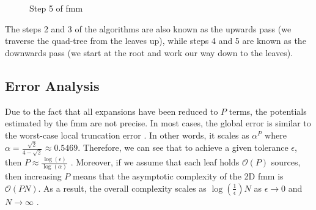 \begin{enumerate}
  \begin{figure}
    \centering
    \caption{Step 5 of \gls{fmm}}
    \label{fig:step5}
  \end{figure}
\end{enumerate}

The steps 2 and 3 of the algorithms are also known as the upwards pass (we traverse the quad-tree from the leaves up), while steps 4 and 5 are known as the downwards pass (we start at the root and work our way down to the leaves).

\subsection{Error Analysis}

Due to the fact that all expansions have been reduced to $P$ terms, the potentials estimated by the \gls{fmm} are not precise.
In most cases, the global error is similar to the worst-case local truncation error \cite{articleErick}.
In other words, it scales as  $\alpha^P$ where  $\alpha = \frac{\sqrt{2}}{4-\sqrt{2}} \approx 0.5469$.
Therefore, we can see that to achieve a given tolerance $\epsilon$, then $P \approx \frac{\log (\epsilon)}{\log (\alpha)}$ \cite{Martinsson2015}.
Moreover, if we assume that each leaf holds $\mathcal{O}(P)$ sources, then increasing $P$ means that the asymptotic complexity of the 2D \gls{fmm} is $\mathcal{O}(P N)$.
As a result, the overall complexity scales as $\log (\frac 1 \epsilon) N$ as $\epsilon \rightarrow 0$ and $N \rightarrow \infty$ \cite{Martinsson2015}.
